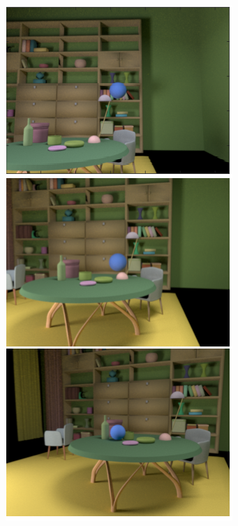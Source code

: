 \documentclass{jov}
\begin{document}
\begin{figure}
\begin{subfigure}[b]{0.18 \textwidth}
        \includegraphics[width=\textwidth]{../FiguresDraft4/Figure5/Figure5_d.png}

\end{subfigure}
\end{figure}
\end{document}
